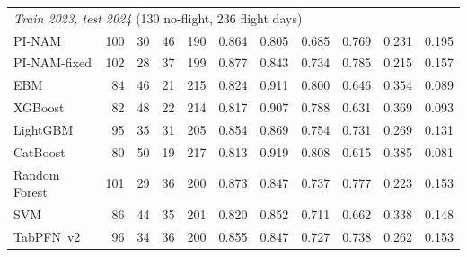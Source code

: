 \begin{tabular}{lrrrrcccccc}
\multicolumn{11}{l}{\textit{Train 2023, test 2024} (130 no-flight, 236 flight days)} \\
PI-NAM & 100 & 30 & 46 & 190 & 0.864 & 0.805 & 0.685 & 0.769 & 0.231 & 0.195 \\
PI-NAM-fixed & 102 & 28 & 37 & 199 & 0.877 & 0.843 & 0.734 & 0.785 & 0.215 & 0.157 \\
EBM & 84 & 46 & 21 & 215 & 0.824 & 0.911 & 0.800 & 0.646 & 0.354 & 0.089 \\
XGBoost & 82 & 48 & 22 & 214 & 0.817 & 0.907 & 0.788 & 0.631 & 0.369 & 0.093 \\
LightGBM & 95 & 35 & 31 & 205 & 0.854 & 0.869 & 0.754 & 0.731 & 0.269 & 0.131 \\
CatBoost & 80 & 50 & 19 & 217 & 0.813 & 0.919 & 0.808 & 0.615 & 0.385 & 0.081 \\
Random Forest & 101 & 29 & 36 & 200 & 0.873 & 0.847 & 0.737 & 0.777 & 0.223 & 0.153 \\
SVM & 86 & 44 & 35 & 201 & 0.820 & 0.852 & 0.711 & 0.662 & 0.338 & 0.148 \\
TabPFN~v2 & 96 & 34 & 36 & 200 & 0.855 & 0.847 & 0.727 & 0.738 & 0.262 & 0.153 \\
\bottomrule
\end{tabular}
